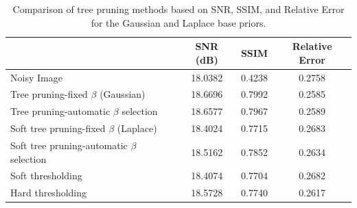 \documentclass[11pt,a4paper]{article}
\begin{document}
\begin{table}[ht]
\vspace{0.5cm}
    \centering
    \caption{Comparison of tree pruning methods based on SNR, SSIM, and Relative Error for the Gaussian and Laplace base priors.}
    \label{tab:denoising_results L2}
    \begin{tabular}{|l|c|c|c|}
        \hline
        \textbf{} & \textbf{SNR (dB)} & \textbf{SSIM} & \textbf{Relative Error} \\
        \hline
        Noisy Image & 18.0382 & 0.4238 & 0.2758 \\
        Tree pruning-fixed $\beta$ (Gaussian) & 18.6696 & 0.7992 & 0.2585  \\
        Tree pruning-automatic $\beta$ selection & 18.6577 & 0.7967 & 0.2589 \\
        Soft tree pruning-fixed $\beta$ (Laplace) & 18.4024 & 0.7715 & 0.2683  \\
        Soft tree pruning-automatic $\beta$ selection & 18.5162 & 0.7852 & 0.2634 \\
         Soft thresholding  & 18.4074 & 0.7704 & 0.2682 \\
        Hard thresholding  & 18.5728 & 0.7740 & 0.2617\\
        \hline
    \end{tabular}
\end{table}


 \newpage

\vspace{1cm}



%
\end{document}
